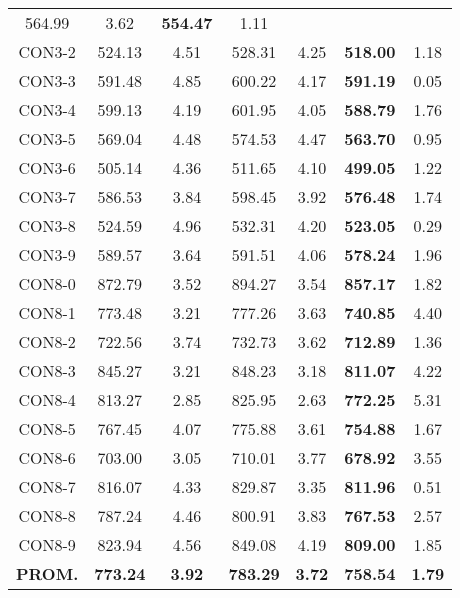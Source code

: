\begin{table}[ht]
\begin{tabular}{c c c c c c c}
564.99 & 3.62 & \bf{554.47} & 
1.11\\CON3-2 & 524.13 & 4.51 & 
528.31 & 4.25 & \bf{518.00} & 
1.18\\CON3-3 & 591.48 & 4.85 & 
600.22 & 4.17 & \bf{591.19} & 
0.05\\CON3-4 & 599.13 & 4.19 & 
601.95 & 4.05 & \bf{588.79} & 
1.76\\CON3-5 & 569.04 & 4.48 & 
574.53 & 4.47 & \bf{563.70} & 
0.95\\CON3-6 & 505.14 & 4.36 & 
511.65 & 4.10 & \bf{499.05} & 
1.22\\CON3-7 & 586.53 & 3.84 & 
598.45 & 3.92 & \bf{576.48} & 
1.74\\CON3-8 & 524.59 & 4.96 & 
532.31 & 4.20 & \bf{523.05} & 
0.29\\CON3-9 & 589.57 & 3.64 & 
591.51 & 4.06 & \bf{578.24} & 
1.96\\CON8-0 & 872.79 & 3.52 & 
894.27 & 3.54 & \bf{857.17} & 
1.82\\CON8-1 & 773.48 & 3.21 & 
777.26 & 3.63 & \bf{740.85} & 
4.40\\CON8-2 & 722.56 & 3.74 & 
732.73 & 3.62 & \bf{712.89} & 
1.36\\CON8-3 & 845.27 & 3.21 & 
848.23 & 3.18 & \bf{811.07} & 
4.22\\CON8-4 & 813.27 & 2.85 & 
825.95 & 2.63 & \bf{772.25} & 
5.31\\CON8-5 & 767.45 & 4.07 & 
775.88 & 3.61 & \bf{754.88} & 
1.67\\CON8-6 & 703.00 & 3.05 & 
710.01 & 3.77 & \bf{678.92} & 
3.55\\CON8-7 & 816.07 & 4.33 & 
829.87 & 3.35 & \bf{811.96} & 
0.51\\CON8-8 & 787.24 & 4.46 & 
800.91 & 3.83 & \bf{767.53} & 
2.57\\CON8-9 & 823.94 & 4.56 & 
849.08 & 4.19 & \bf{809.00} & 
1.85\\\bf{PROM.} & 
\bf{773.24} & \bf{3.92} & \bf{783.29} & \bf{3.72} & \bf{758.54} & \bf{1.79}\\[1ex]\hline
\end{tabular}
\label{table:nonlin}
\end{table} \clearpage
